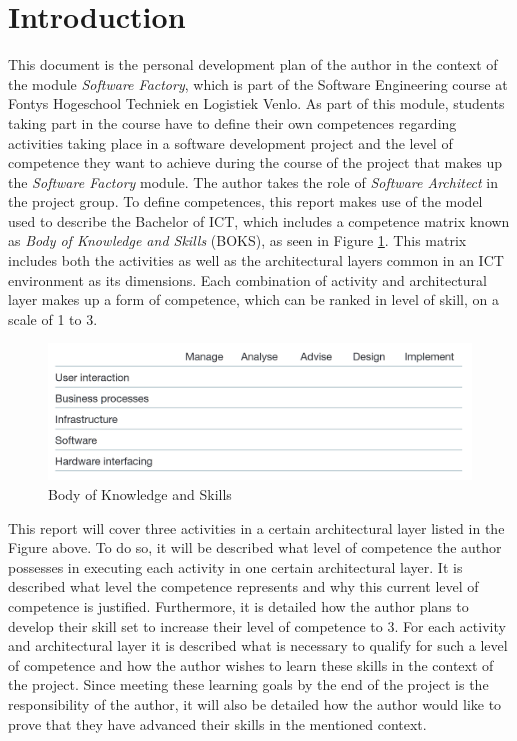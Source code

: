 \section{Introduction}
\label{sec:introduction}

This document is the personal development plan of the author in the context of the module \textit{Software Factory}, which is part of the Software Engineering course at Fontys Hogeschool Techniek en Logistiek Venlo. As part of this module, students taking part in the course have to define their own competences regarding activities taking place in a software development project and the level of competence they want to achieve during the course of the project that makes up the \textit{Software Factory} module. The author takes the role of \textit{Software Architect} in the project group.
\newline
To define competences, this report makes use of the model used to describe the Bachelor of ICT, which includes a competence matrix known as \textit{Body of Knowledge and Skills} (BOKS), as seen in Figure \ref{fig:boks}. This matrix includes both the activities as well as the architectural layers common in an ICT environment as its dimensions. Each combination of activity and architectural layer makes up a form of competence, which can be ranked in level of skill, on a scale of 1 to 3.

\begin{figure}[!ht]
\includegraphics[width=\textwidth]{Pics/boks.png}
\caption{Body of Knowledge and Skills}
\label{fig:boks}
\end{figure}

This report will cover three activities in a certain architectural layer listed in the Figure above. To do so, it will be described what level of competence the author possesses in executing each activity in one certain architectural layer. It is described what level the competence represents and why this current level of competence is justified. Furthermore, it is detailed how the author plans to develop their skill set to increase their level of competence to 3. For each activity and architectural layer it is described what is necessary to qualify for such a level of competence and how the author wishes to learn these skills in the context of the project. Since meeting these learning goals by the end of the project is the responsibility of the author, it will also be detailed how the author would like to prove that they have advanced their skills in the mentioned context.